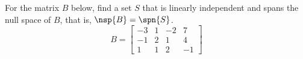 For the matrix $B$ below, find a set $S$ that is linearly independent and spans the null space of $B$, that is, $\nsp{B}=\spn{S}$.
%
\begin{equation*}
B=
\begin{bmatrix}
-3 & 1 & -2 & 7\\ 
-1 & 2 & 1 & 4\\ 
1 & 1 & 2 & -1
\end{bmatrix}
\end{equation*}
%